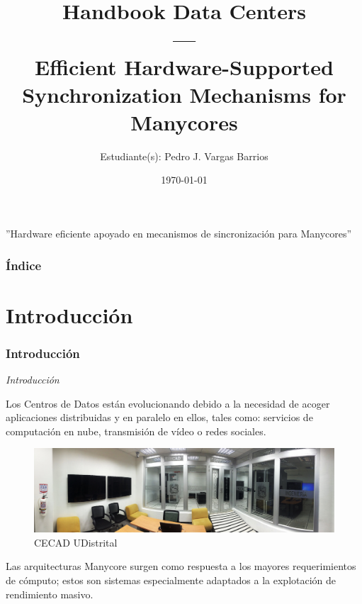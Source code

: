 \documentclass[11pt]{beamer}					%
\title{Handbook Data Centers \\ --- \\ Efficient Hardware-Supported Synchronization Mechanisms for Manycores}
\author{Estudiante(s): Pedro J. Vargas Barrios}
\institute[UD]{Universidad Distrital Francisco José de Caldas}
\date{\today}
\begin{document}
	
	
	\begin{frame}[fragile]							%
		\titlepage 
		\begin{small}
			''Hardware eficiente apoyado en
mecanismos de sincronización para Manycores''
		\end{small}
	\end{frame}	

    	\begin{frame}[fragile]							%
		\frametitle{Índice}	
		\tableofcontents
	\end{frame}	

\section{Introducción}
		 \begin{frame}[fragile]						%
			\frametitle{Introducción}
			\begin{huge}
			\begin{center}
				\emph{\textit{Introducción}}
			\end{center}
			\end{huge}
Los Centros de Datos están evolucionando debido a la necesidad de acoger aplicaciones
distribuidas y en paralelo en ellos, tales como: servicios de computación en
nube, transmisión de vídeo o redes sociales.\\
\begin{figure}[ht] %
	\centering
		\includegraphics[scale=0.07]{imagenes/cecad.jpg}   %
	\caption{CECAD UDistrital} \label{fig:CECAD UDitrital}
\end{figure}
Las arquitecturas Manycore surgen como respuesta a los mayores requerimientos de cómputo; estos son sistemas especialmente adaptados a la explotación de rendimiento masivo.
				
		\end{frame}	
\end{document}

